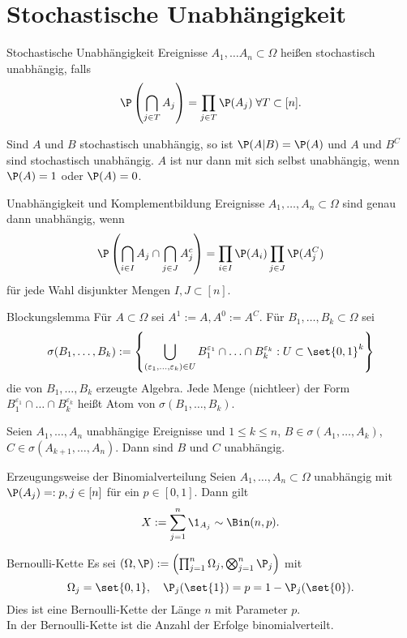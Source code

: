 \section*{Stochastische Unabhängigkeit}

\begin{karte}{Stochastische Unabhängigkeit}
    Ereignisse \( A_1, \ldots A_n \subset \Omega \) heißen stochastisch 
    unabhängig, falls 
    \[ \P\left( \bigcap_{j\in T} A_j \right) = \prod_{j \in T} \P(A_j) \; \forall T\subset [n]. \]

    Sind \( A \) und \( B \) stochastisch unabhängig, so ist \( \P(A|B) = \P(A) \) 
    und \( A \) und \( B^C \) sind stochastisch unabhängig.
    \( A \) ist nur dann mit sich selbst unabhängig, wenn \( \P(A) = 1 \) oder \( \P(A) = 0 \).
\end{karte}

\begin{karte}{Unabhängigkeit und Komplementbildung}
    Ereignisse \( A_1,\ldots, A_n \subset \Omega \) sind genau dann unabhängig, wenn 
    \[ \P\left( \bigcap_{i \in I} A_j \cap \bigcap_{j \in J} A_j^c \right) 
    = \prod_{i\in I} \P(A_i) \prod_{j\in J} \P(A_j^C) \] 
    für jede Wahl disjunkter Mengen \( I,J \subset [n] \).
\end{karte}

\begin{karte}{Blockungslemma}
    Für \( A \subset \Omega \) sei \( A^1 := A, A^0 := A^C \).
    Für \( B_1,\ldots, B_k \subset \Omega \) sei 
    \[ \sigma(B_1,\ldots,B_k) 
    := \left\{ \bigcup_{ (\varepsilon_1,\ldots,\varepsilon_k)\in U } 
    B_1^{\varepsilon_1} \cap \ldots \cap B_k^{\varepsilon_k} : U \subset \set{0,1}^k \right\} \]
    die von \( B_1,\ldots,B_k \) erzeugte Algebra.
    Jede Menge (nichtleer) der Form \\
    \( B_1^{\varepsilon_1} \cap \ldots \cap B_k^{\varepsilon_k} \)
    heißt Atom von \( \sigma(B_1,\ldots,B_k) \).

    Seien \( A_1, \ldots, A_n \) unabhängige Ereignisse und \(1\leq k \leq n\), 
    \( B \in \sigma(A_1,\ldots,A_k) \), \( C \in \sigma(A_{k+1}, \ldots, A_n) \). 
    Dann sind \(B\) und \(C\) unabhängig.
\end{karte}

\begin{karte}{Erzeugungsweise der Binomialverteilung}
    Seien \( A_1, \ldots, A_n \subset \Omega \) unabhängig mit 
    \( \P(A_j) =: p, j \in [n] \) für ein \( p \in [0,1] \). 
    Dann gilt 
    \[ X := \sum_{j=1}^n \1_{A_j} \sim \Bin(n,p). \]
\end{karte}

\begin{karte}{Bernoulli-Kette}
    Es sei \( (\Omega, \P) := \left( \prod_{j=1}^n \Omega_j, 
    \bigotimes_{j=1}^n \P_j \right) \) mit 
    \[ \Omega_j = \set{0,1}, \quad \P_j(\set{1}) = p = 1 - \P_j(\set{0}). \]
    Dies ist eine Bernoulli-Kette der Länge \(n\) mit Parameter \(p\).\\
    In der Bernoulli-Kette ist die Anzahl der Erfolge binomialverteilt.
\end{karte}